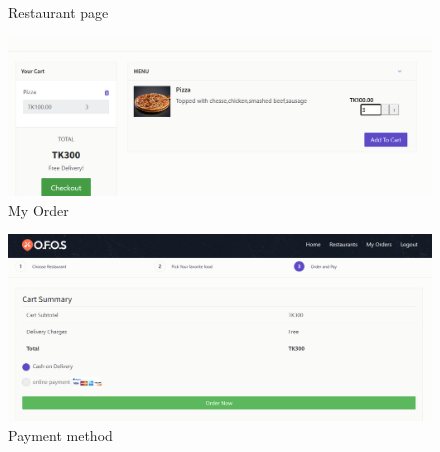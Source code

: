 {{\begin{figure}[h]
    \caption{Restaurant page}
    \label{fig.e}
\end{figure}\begin{figure}[h]
    \centering
    \includegraphics[scale=0.55]{user4.png}
    \caption{My Order}
    \label{fig.5}
\end{figure}\begin{figure}[h]
    \centering
    \includegraphics[scale=0.55]{user5.png}
    \caption{Payment method}
    \label{fig.5}
\end{figure}}}

